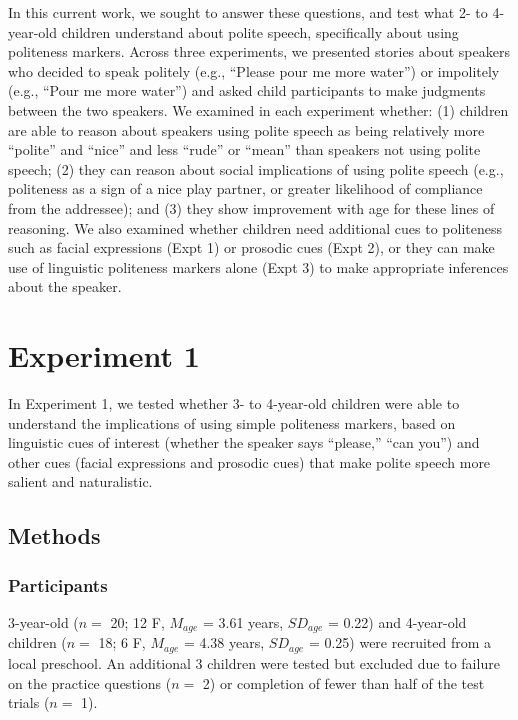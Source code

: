 \documentclass[10pt, letterpaper]{article}
\begin{document}
In this current work, we sought to answer these questions, and test what
2- to 4-year-old children understand about polite speech, specifically
about using politeness markers. Across three experiments, we presented
stories about speakers who decided to speak politely (e.g., ``Please
pour me more water'') or impolitely (e.g., ``Pour me more water'') and
asked child participants to make judgments between the two speakers. We
examined in each experiment whether: (1) children are able to reason
about speakers using polite speech as being relatively more ``polite''
and ``nice'' and less ``rude'' or ``mean'' than speakers not using
polite speech; (2) they can reason about social implications of using
polite speech (e.g., politeness as a sign of a nice play partner, or
greater likelihood of compliance from the addressee); and (3) they show
improvement with age for these lines of reasoning. We also examined
whether children need additional cues to politeness such as facial
expressions (Expt 1) or prosodic cues (Expt 2), or they can make use of
linguistic politeness markers alone (Expt 3) to make appropriate
inferences about the speaker.

\section{Experiment 1}\label{experiment-1}

In Experiment 1, we tested whether 3- to 4-year-old children were able
to understand the implications of using simple politeness markers, based
on linguistic cues of interest (whether the speaker says ``please,''
``can you'') and other cues (facial expressions and prosodic cues) that
make polite speech more salient and naturalistic.

\subsection{Methods}\label{methods}

\subsubsection{Participants}\label{participants}

3-year-old (\(n=\) 20; 12 F, \(M_{age}\) = 3.61 years, \(SD_{age}\) =
0.22) and 4-year-old children (\(n=\) 18; 6 F, \(M_{age}\) = 4.38 years,
\(SD_{age}\) = 0.25) were recruited from a local preschool. An
additional 3 children were tested but excluded due to failure on the
practice questions (\(n=\) 2) or completion of fewer than half of the
test trials (\(n=\) 1).
\end{document}
